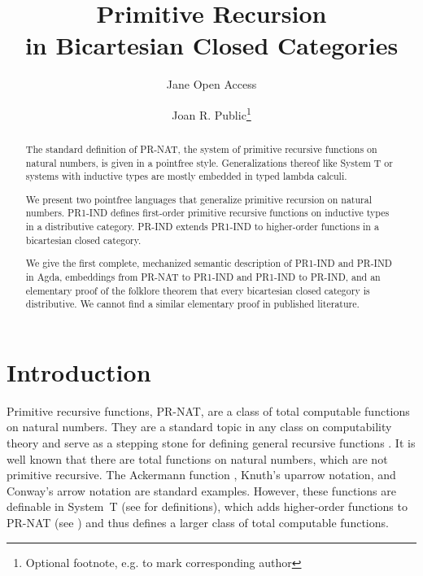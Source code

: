 \documentclass[a4paper,USenglish,cleveref, autoref, thm-restate]{lipics-v2021}
\title{Primitive Recursion \\ in Bicartesian Closed Categories} %
\author{Jane {Open Access}}{Dummy University Computing Laboratory, [optional: Address], Country \and My second affiliation, Country \and \url{http://www.myhomepage.edu} }{johnqpublic@dummyuni.org}{https://orcid.org/0000-0002-1825-0097}{}%
\author{Joan R. Public\footnote{Optional footnote, e.g. to mark corresponding author}}{Department of Informatics, Dummy College, [optional: Address], Country}{joanrpublic@dummycollege.org}{[orcid]}{}
\begin{document}
\newcommand\Nat{\ensuremath{\mathbb{N}}}
\newcommand{\many}[2]{{#1}_0,\dots,{#1}_{#2-1}}
\newcommand{\xs}{\many{x}}
\newcommand{\xn}{\xs{n}}

\maketitle

\begin{abstract}
  The standard definition of PR-NAT, the system of primitive recursive functions on natural
  numbers, is given in a pointfree style. Generalizations thereof like
  System T or systems with inductive types are mostly embedded in
  typed lambda calculi.

  We present two pointfree languages that generalize primitive
  recursion on natural numbers. PR1-IND defines
  first-order primitive recursive functions on inductive types in a
  distributive
  category. PR-IND extends PR1-IND to higher-order functions in a
  bicartesian closed category.

  We give the first complete, mechanized semantic description of
  PR1-IND and PR-IND in Agda, embeddings from PR-NAT to PR1-IND and
  PR1-IND to PR-IND, and an elementary proof of the folklore theorem
  that every bicartesian closed category is distributive. We cannot
  find a similar elementary proof in published literature.
\end{abstract}

\section{Introduction}
\label{sec:introduction}

Primitive recursive functions, PR-NAT, are a class of total computable
functions on natural numbers. They are a standard topic in any
class on computability theory and serve as a stepping stone for
defining general recursive functions
\cite{kleene36:_gener_recur_funct_natur_number}.
It is well known that there are total functions on natural
numbers, which are not primitive recursive. The
Ackermann function \cite{szasz1991machine}, Knuth's uparrow
notation, and Conway's arrow notation are standard examples. However,
these functions are definable in System~T (see
\cite{DBLP:journals/corr/Widemann16} for definitions), which adds higher-order functions to PR-NAT (see
\cite[Chapter 9]{DBLP:books/cu/Ha2016}) and thus defines a larger
class of total computable functions.
\end{document}
